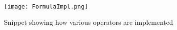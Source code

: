 \begin{figure}[H]
	\label{fig:formulaImpl}
	\caption{Snippet showing how various operators are implemented}
	\texttt{[image: FormulaImpl.png]}
\end{figure}









